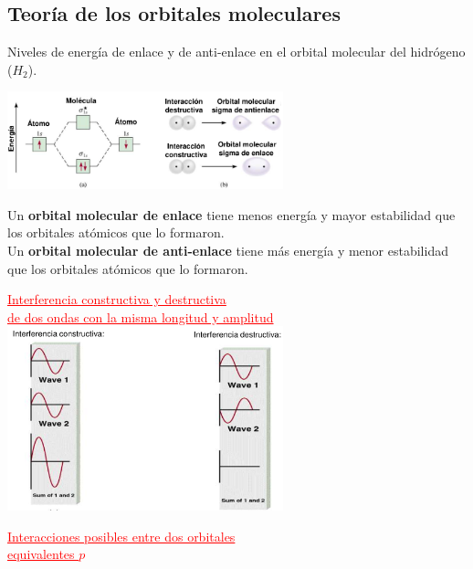     \subsection{Teoría de los orbitales moleculares}
        \sangria{} Niveles de energía de enlace y de anti-enlace en el orbital molecular del hidrógeno ($H_2$).
        \begin{center} \includegraphics[width=8cm]{./imagenes/enlaceYAntiEnlace.png} \end{center}
        \sangria{} Un \textbf{orbital molecular de enlace} tiene menos energía y mayor estabilidad que los orbitales atómicos que lo formaron. \\
        \sangria{} Un \textbf{orbital molecular de anti-enlace} tiene más energía y menor estabilidad que los orbitales atómicos que lo formaron.
        \begin{center} \textcolor{red}{\underline{Interferencia constructiva y destructiva}\\ \underline{de dos ondas con la misma longitud y amplitud}} \\[10pt] \includegraphics[width=8cm]{./imagenes/interferenciaConstructivaYDestructiva.png} \end{center}
        \begin{center} \textcolor{red}{\underline{Interacciones posibles entre dos orbitales} \\ \underline{equivalentes $p$}} \end{center}
